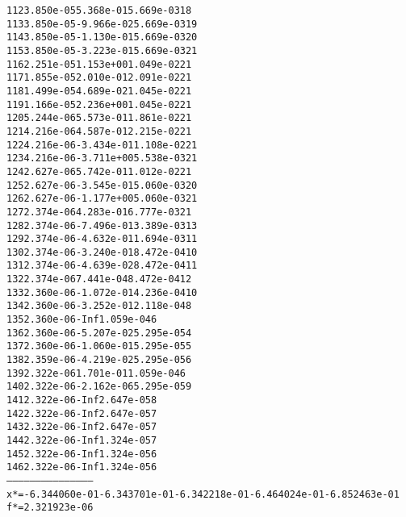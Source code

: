 \begin{alltt}
 112   3.850e-05   5.368e-01   5.669e-03   18
 113   3.850e-05  -9.966e-02   5.669e-03   19
 114   3.850e-05  -1.130e-01   5.669e-03   20
 115   3.850e-05  -3.223e-01   5.669e-03   21
 116   2.251e-05   1.153e+00   1.049e-02   21
 117   1.855e-05   2.010e-01   2.091e-02   21
 118   1.499e-05   4.689e-02   1.045e-02   21
 119   1.166e-05   2.236e+00   1.045e-02   21
 120   5.244e-06   5.573e-01   1.861e-02   21
 121   4.216e-06   4.587e-01   2.215e-02   21
 122   4.216e-06  -3.434e-01   1.108e-02   21
 123   4.216e-06  -3.711e+00   5.538e-03   21
 124   2.627e-06   5.742e-01   1.012e-02   21
 125   2.627e-06  -3.545e-01   5.060e-03   20
 126   2.627e-06  -1.177e+00   5.060e-03   21
 127   2.374e-06   4.283e-01   6.777e-03   21
 128   2.374e-06  -7.496e-01   3.389e-03   13
 129   2.374e-06  -4.632e-01   1.694e-03   11
 130   2.374e-06  -3.240e-01   8.472e-04   10
 131   2.374e-06  -4.639e-02   8.472e-04   11
 132   2.374e-06   7.441e-04   8.472e-04   12
 133   2.360e-06  -1.072e-01   4.236e-04   10
 134   2.360e-06  -3.252e-01   2.118e-04    8
 135   2.360e-06        -Inf   1.059e-04    6
 136   2.360e-06  -5.207e-02   5.295e-05    4
 137   2.360e-06  -1.060e-01   5.295e-05    5
 138   2.359e-06  -4.219e-02   5.295e-05    6
 139   2.322e-06   1.701e-01   1.059e-04    6
 140   2.322e-06  -2.162e-06   5.295e-05    9
 141   2.322e-06        -Inf   2.647e-05    8
 142   2.322e-06        -Inf   2.647e-05    7
 143   2.322e-06        -Inf   2.647e-05    7
 144   2.322e-06        -Inf   1.324e-05    7
 145   2.322e-06        -Inf   1.324e-05    6
 146   2.322e-06        -Inf   1.324e-05    6
---------------------------------------------
x* = -6.344060e-01  -6.343701e-01  -6.342218e-01  -6.464024e-01  -6.852463e-01  
f* = 2.321923e-06
\end{alltt}
